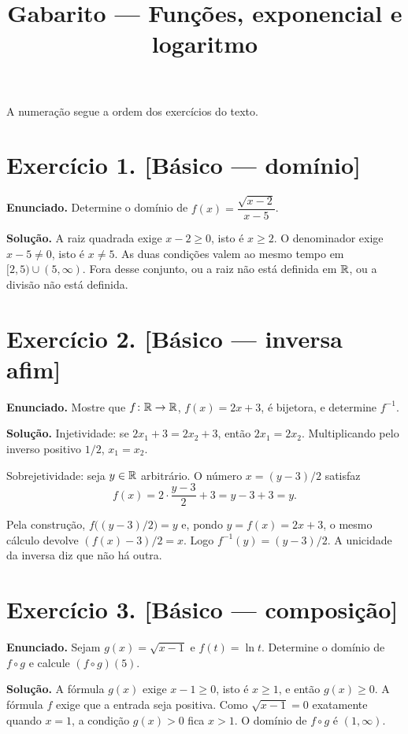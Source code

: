 \documentclass[11pt,a4paper]{article}
\title{Gabarito --- Funções, exponencial e logaritmo}
\author{}
\date{}
\begin{document}
\maketitle
\tableofcontents

A numeração segue a ordem dos exercícios do texto.

\section*{Exercício 1. [Básico --- domínio]}

\textbf{Enunciado.} Determine o domínio de $f(x)=\dfrac{\sqrt{x-2}}{x-5}$.

\textbf{Solução.}
A raiz quadrada exige $x-2\ge 0$, isto é $x\ge 2$. O denominador exige $x-5\neq 0$, isto é $x\neq 5$. As duas condições valem ao mesmo tempo em $[2,5)\cup(5,\infty)$. Fora desse conjunto, ou a raiz não está definida em $\mathbb{R}$, ou a divisão não está definida.

\section*{Exercício 2. [Básico --- inversa afim]}

\textbf{Enunciado.} Mostre que $f\colon\mathbb{R}\to\mathbb{R}$, $f(x)=2x+3$, é bijetora, e determine $f^{-1}$.

\textbf{Solução.}
Injetividade: se $2x_1+3=2x_2+3$, então $2x_1=2x_2$. Multiplicando pelo inverso positivo $1/2$, $x_1=x_2$.

Sobrejetividade: seja $y\in\mathbb{R}$ arbitrário. O número $x=(y-3)/2$ satisfaz
\[
f(x)=2\cdot\frac{y-3}{2}+3=y-3+3=y.
\]

Pela construção, $f\bigl((y-3)/2\bigr)=y$ e, pondo $y=f(x)=2x+3$, o mesmo cálculo devolve $(f(x)-3)/2=x$. Logo $f^{-1}(y)=(y-3)/2$. A unicidade da inversa diz que não há outra.

\section*{Exercício 3. [Básico --- composição]}

\textbf{Enunciado.} Sejam $g(x)=\sqrt{x-1}$ e $f(t)=\ln t$. Determine o domínio de $f\circ g$ e calcule $(f\circ g)(5)$.

\textbf{Solução.}
A fórmula $g(x)$ exige $x-1\ge 0$, isto é $x\ge 1$, e então $g(x)\ge 0$. A fórmula $f$ exige que a entrada seja positiva. Como $\sqrt{x-1}=0$ exatamente quando $x=1$, a condição $g(x)>0$ fica $x>1$. O domínio de $f\circ g$ é $(1,\infty)$.
\end{document}
